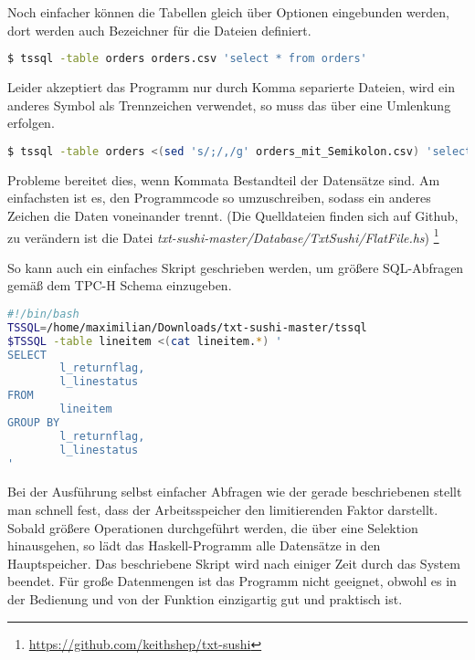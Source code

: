 Noch einfacher können die Tabellen gleich über Optionen eingebunden werden, dort werden auch Bezeichner für die Dateien definiert.
\begin{lstlisting}[language=Bash]
$ tssql -table orders orders.csv 'select * from orders'
\end{lstlisting}

Leider akzeptiert das Programm nur durch Komma separierte Dateien, wird ein anderes Symbol als Trennzeichen verwendet, so muss das über eine Umlenkung erfolgen.
\begin{lstlisting}[language=Bash]
$ tssql -table orders <(sed 's/;/,/g' orders_mit_Semikolon.csv) 'select * from orders'
\end{lstlisting}
Probleme bereitet dies, wenn Kommata Bestandteil der Datensätze sind. Am einfachsten ist es, den Programmcode so umzuschreiben, sodass ein anderes Zeichen die Daten voneinander trennt. (Die Quelldateien finden sich auf Github, zu verändern ist die Datei \textit{txt-sushi-master/Database/TxtSushi/FlatFile.hs})
\footnote{\url{https://github.com/keithshep/txt-sushi}}

So kann auch ein einfaches Skript geschrieben werden, um größere SQL-Abfragen gemäß dem TPC-H Schema einzugeben.
\begin{lstlisting}[language=Bash]
#!/bin/bash
TSSQL=/home/maximilian/Downloads/txt-sushi-master/tssql
$TSSQL -table lineitem <(cat lineitem.*) '
SELECT
        l_returnflag,
        l_linestatus
FROM
        lineitem
GROUP BY
        l_returnflag,
        l_linestatus
'

\end{lstlisting}
Bei der Ausführung selbst einfacher Abfragen wie der gerade beschriebenen stellt man schnell fest, dass der Arbeitsspeicher den limitierenden Faktor darstellt. Sobald größere Operationen durchgeführt werden, die über eine Selektion hinausgehen, so lädt das Haskell-Programm alle Datensätze in den Hauptspeicher. Das beschriebene Skript wird nach einiger Zeit durch das System beendet. Für große Datenmengen ist das Programm nicht geeignet, obwohl es in der Bedienung und von der Funktion einzigartig gut und praktisch ist.

